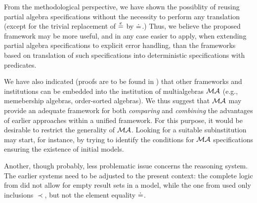 \documentclass[10pt]{article}
\begin{document}
From the methodological perspective, we have shown the possiblity of
reusing partial algebra specifications without the necessity to perform any
translation (except for the trivial replacement of $\stackrel{e}{=}$ by $\mathrel{\dot{=} }$.)
Thus,
we believe the proposed framework may be more useful, and in any case easier
to apply, when extending partial algebra specifications to explicit error
handling, than the frameworks based on translation of such specifications into
deterministic specifications with predicates.

We have also indicated (proofs are to be found in \cite{TR}) that other
frameworks and institutions can be embedded into the institution of
multialgebras ${\mathcal{MA}}$ (e.g., memebership algebras, order-sorted
algebras). 
We thus suggest that ${\mathcal{MA}}$ may
provide an adequate framework for both {\em comparing} and {\em combining} the advantages
of earlier approaches within a unified framework.
For this purpose, it would be desirable to restrict the 
generality of ${\mathcal{MA}}$. Looking for a suitable subinstitution may
start, for instance, by trying to identify the conditions for ${\mathcal{MA}}$
specifications ensuring the existence of initial models. 

Another, though probably, less problematic issue concerns the reasoning
system. The earlier systems need to be adjusted to the present context: the
complete logic from \cite{toplas,calc} did not allow for empty result sets in a model,
while the one from \cite{BK} used only inclusions $\prec$, but not the element
equality $\mathrel{\dot{=} }$.




\end{document}
